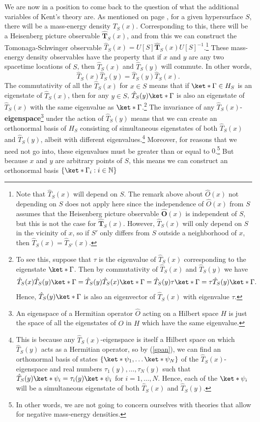 \documentclass[12pt]{report}
\begin{document}
We are now in a position to come back to the question of what the additional variables of Kent's theory are. As mentioned on page \pageref{massenergydensity}, for a given hypersurface $S$,  there will be a mass-energy density $T_S(x)$. Corresponding to this, there will be a Heisenberg picture observable $\hat{\bm{T}}_S(x)$, %
%
 and from this we can construct the Tomonaga-Schwinger observable $\hat{T}_S(x)=U[S]\hat{\bm{T}}_S(x)U[S]^{-1}$.\footnote{Note that $\hat{T}_S(x)$ will depend on $S$. The remark above about $\hat{O}(x)$ not depending on $S$ does not apply here since the independence of $\hat{O}(x)$ from $S$ assumes that the Heisenberg picture observable $\hat{\bm{O}}(x)$ is independent of $S$, but this is not the case for  $\hat{\bm{T}}_S(x)$. However,  $\hat{T}_S(x)$ will only depend on $S$ in the vicinity of $x$, so if $S'$ only differs from $S$ outside a neighborhood of $x$, then $\hat{T}_S(x) =\hat{T}_{S'}(x)$.} These mass-energy density observables have the property that if $x$ and $y$ are any two spacetime locations of $S$, then $\hat{T}_S(x)$ and $\hat{T}_S(y)$ will commute. In other words,
$$\hat{T}_S(x)\hat{T}_S(y)=\hat{T}_S(y)\hat{T}_S(x).$$
The commutativity of all the $\hat{T}_S(x)$ for $x\in S$ means that if $\ket*{\Gamma}\in H_S$ is an eigenstate of $\hat{T}_S(x)$, then for any $y\in S$, $\hat{T}_S(y)\ket*{\Gamma}$ is also an eigenstate of  $\hat{T}_S(x)$ with the same eigenvalue as $\ket*{\Gamma}$.\footnote{To see this, suppose that $\tau$ is the eigenvalue of $\hat{T}_S(x)$ corresponding to the eigenstate $\ket*{\Gamma}$. Then by 
commutativity of $\hat{T}_S(x)$ and $\hat{T}_S(y)$ we have 
$$\hat{T}_S(x)\hat{T}_S(y)\ket*{\Gamma}=\hat{T}_S(y)\hat{T}_S(x)\ket*{\Gamma}= \hat{T}_S(y)\tau\ket*{\Gamma}=\tau\hat{T}_S(y)\ket*{\Gamma}.$$ 
Hence, $\hat{T}_S(y)\ket*{\Gamma}$ is also an eigenvector of $\hat{T}_S(x)$ with eigenvalue $\tau$.} The invariance of any $\hat{T}_S(x)$-\textbf{eigenspace}\footnote{An eigenspace of a Hermitian operator $\hat{O}$ acting on a Hilbert space $H$ is just the space of all the eigenstates of $\hat{O}$ in $H$ which have the same eigenvalue.} under the action of   $\hat{T}_S(y)$ means that we can create an orthonormal basis of $H_S$ consisting of simultaneous eigenstates of both  $\hat{T}_S(x)$ and  $\hat{T}_S(y)$, albeit with different eigenvalues.\footnote{This is because any $\hat{T}_S(x)$-eigenspace is itself a Hilbert space on which $\hat{T}_S(y)$ acts as a Hermitian operator, so by (\ref{span}), we can find an orthonormal basis of states $\{\ket*{\psi_1},\ldots\ket*{\psi_N}\}$ of the $\hat{T}_S(x)$-eigenspace and real numbers $\tau_{1}(y),\ldots,\tau_{N}(y)$ such that $\hat{T}_S(y)\ket*{\psi_i}=\tau_{i}(y)\ket*{\psi_i}$ for $i=1,\ldots,N.$ Hence, each of the $\ket*{\psi_i}$ will be a simultaneous eigenstate of both $\hat{T}_S(x)$ and $\hat{T}_S(y)$.} Moreover, for reasons that we need not go into, these eigenvalues must be greater than or equal to $0$.\footnote{In other words, we are not going to concern ourselves with theories that allow for negative mass-energy densities.} But because $x$ and $y$ are arbitrary points of $S$, this means  we can construct an orthonormal basis $\{\ket*{\Gamma_{i}}:i\in\mathbb{N}\}$  %
\end{document}

